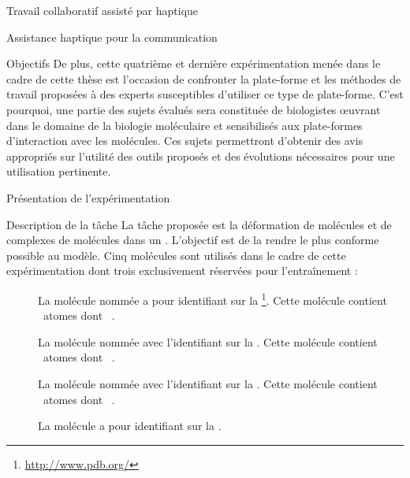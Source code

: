 \documentclass[myfrancais,ngerman,english,frenchb]{mythesis}
\begin{document}
\begin{mychapter}{Travail collaboratif assisté par haptique}
\begin{mysection}{Assistance haptique pour la communication}
\begin{mysubsection}{Objectifs}
				De plus, cette quatrième et dernière expérimentation menée dans le cadre de cette thèse est l'occasion de confronter la plate-forme et les méthodes de travail proposées à des experts susceptibles d'utiliser ce type de plate-forme.
				C'est pourquoi, une partie des sujets évalués sera constituée de biologistes œuvrant dans le domaine de la biologie moléculaire et sensibilisés aux plate-formes d'interaction avec les molécules.
				Ces sujets permettront d'obtenir des avis appropriés sur l'utilité des outils proposés et des évolutions nécessaires pour une utilisation pertinente.
			\end{mysubsection}
		\end{mysection}
		\begin{mysection}{Présentation de l'expérimentation}
			\begin{mysubsection}{Description de la tâche}
				La tâche proposée est la déformation de molécules et de complexes de molécules dans un .
				L'objectif est de la rendre le plus conforme possible au modèle.
				Cinq molécules sont utilisés dans le cadre de cette expérimentation dont trois exclusivement réservées pour l'entraînement :
				\begin{description}
					\item[\myTRPCAGE]
						La molécule nommée \myTRPCAGE {} a pour identifiant \myPDB {} sur la \myPDBbase\footnote{\url{http://www.pdb.org/}}.
						Cette molécule contient ~atomes dont ~.
					\item[\myPrion]
						La molécule nommée \myPrion {} avec l'identifiant \myPDB {} sur la \myPDBbase\footnotemark[\value{footnote}].
						Cette molécule contient ~atomes dont ~.
					\item[\myUbiquitin]
						La molécule nommée \myUbiquitin {} avec l'identifiant \myPDB {} sur la \myPDBbase\footnotemark[\value{footnote}].
						Cette molécule contient ~atomes dont ~.
					\item[\myTRPZIPPER]
						La molécule \myTRPZIPPER {} a pour identifiant \myPDB {} sur la \myPDBbase\footnotemark[\value{footnote}].

\end{description}
\end{mysubsection}
\end{mysection}
\end{mychapter}
\end{document}
